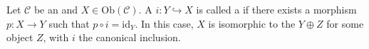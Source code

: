 
\begin{definition} \label{definition:direct_summand_of_an_object_of_an_additive_category}
Let $\mathcal{C}$ be an  and $X \in \mathrm{Ob}(\mathcal{C})$. A  $i: Y \hookrightarrow X$ is called a  if there exists a morphism $p: X \to Y$ such that $p \circ i = \mathrm{id}_Y$. In this case, $X$ is isomorphic to the  $Y \oplus Z$ for some object $Z$, with $i$ the canonical inclusion.
\end{definition}


